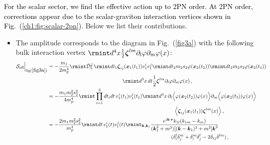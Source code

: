 \textcolor{black}{For the scalar sector, we find the effective action up to 2PN order. At 2PN order, corrections appear due to the scalar-graviton interaction vertices shown in Fig.~(\ref{ch1:fig:scalar-2pn}).} Below we list their contributions.
\begin{itemize}
\item The amplitude corresponds to the diagram in Fig.~(\ref{fig3a}) with the following bulk interaction vertex $\rmint d^4 x\frac{1}{2}\boldsymbol{\zeta}^{lm}\partial_{l}\varphi\partial_{m}\varphi(x)$:
\begin{align}
    \begin{split}
        \mathcal{S}_{\text{eff}}\Big|_{\text{fig}(\ref{fig3a})}&=-\frac{m_1}{2m_p^4}\rmint\bar {\mathcal{D}}{\hat\xi}\,\rmint dt_1 \boldsymbol{\zeta}_{ij}(\boldsymbol{x}_1(t_1))v_1^i v_1^j\rmint dt_2 m_2 s_2 \varphi(\boldsymbol{x}_2(t_2))\rmint dt_2 m_2 s_2 \varphi(\boldsymbol{x}_2(t_3))\\&\hspace{5cm}\rmint d^3x \,dt\frac{1}{2}\boldsymbol{\zeta}^{lm}\partial_{l}\varphi\partial_{m}\varphi(x)\,,\\ &
        =-\frac{ m_1 m_2^2 s_2^2}{4m_p^4}\rmint \prod_{i=1}^3 dt_i dt \,v_1^{i}(t_1)v_1^{j}(t_1)\rmint d^3x \,\partial_{l}\Big\langle\varphi(\boldsymbol{x}_2(t_2))\varphi(x)\Big\rangle \partial_{m}\Big\langle\varphi(\boldsymbol{x}_2(t_3))\varphi(x)\Big\rangle \\& \hspace{8.5cm}
        \Big\langle\boldsymbol{\zeta}_{ij}(\boldsymbol{x}_1(t_1))\boldsymbol{\zeta}^{lm}(x)\Big\rangle\,,\\ &
        =-\frac{2 m_1m_2^2 s_2^2}{m_p^4}\rmint dt\, v_1^{i}(t)v_1^{j}(t)\rmint_{\boldsymbol{k},\boldsymbol{k}_1}\frac{e^{i\boldsymbol{k}\cdot \boldsymbol{r}}k_{1l}(k_{1m}-k_m)}{(\boldsymbol{k}_1^2+m^2)[(\boldsymbol{k}-\boldsymbol{k}_1)^2+m^2]\boldsymbol{k}^2}\\&\,\,\,\,\,\,\,\,\,\,\,\,\,\,\,\,\,\,\,\,\,\,\,\,\,\,\,\,\,\,\,\,\,\,\,\,\,\,\,\,\,\,\,\,\,\,\,\,\,\,\,\,\,\,\,\,\,\,\,\,\,\,\,\,\, \,\,\,\,\,\,\,\,\,\,\,\,\,\,\,\,\,\,\,\,\,\,\,\,\,\,\,\,\,\,\,\,\,\,\,\,\,\,\,\,\,\,\,\,\,\,\,\,\,\,\,\,\,\,\,\,\,\,\,\,\,\,\,\,\,\,\,\,\,\,\,\,\,\,\,\,(\delta_{i}^{l}\delta_j^m+\delta_{i}^m\delta_j^l-2\delta_{ij}\delta^{lm})\,,\\ &

\end{split}
\end{align}
\end{itemize}
